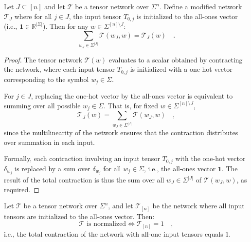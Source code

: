 \documentclass[../../main.tex]{subfiles}
\begin{document}
    \begin{lemma}
        \label{lemma:normalized_tensor_networks}
        Let $J \subseteq [n]$ and let $\mathcal{T}$ be a tensor network over $\Sigma^n$. Define a modified network $\mathcal{T}_J$ where for all $j \in J$, the input tensor $T_{0,j}$ is initialized to the all-ones vector (i.e., $\mathbf{1} \in \mathbb{R}^{|\Sigma|}$). Then for any $w \in \Sigma^{[n] \setminus J}$:
        \[
            \sum_{w_J \in \Sigma^{|J|}} \mathcal{T}(w_J, w) = \mathcal{T}_J(w) \quad .
        \]
    \end{lemma}
    \begin{proof}
    The tensor network $\mathcal{T}(w)$ evaluates to a scalar obtained by contracting the network, where each input tensor $T_{0,j}$ is initialized with a one-hot vector corresponding to the symbol $w_j \in \Sigma$.

    For $j \in J$, replacing the one-hot vector by the all-ones vector is equivalent to summing over all possible $w_j \in \Sigma$. That is, for fixed $w \in \Sigma^{[n] \setminus J}$,
    \[
        \mathcal{T}_J(w) = \sum_{w_J \in \Sigma^{|J|}} \mathcal{T}(w_J, w) \quad ,
    \]
    since the multilinearity of the network ensures that the contraction distributes over summation in each input.

    Formally, each contraction involving an input tensor $T_{0,j}$ with the one-hot vector $\delta_{w_j}$ is replaced by a sum over $\delta_{w_j}$ for all $w_j \in \Sigma$, i.e., the all-ones vector $\mathbf{1}$. The result of the total contraction is thus the sum over all \( w_J \in \Sigma^{|J|} \) of \( \mathcal{T}(w_J, w) \), as required.
    \end{proof}

    \begin{corollary}
        Let $\mathcal{T}$ be a tensor network over $\Sigma^n$, and let $\mathcal{T}_{[n]}$ be the network where all input tensors are initialized to the all-ones vector. Then:
        \[
            \mathcal{T} \text{ is normalized} \iff \mathcal{T}_{[n]} = 1 \quad ,
        \]
        i.e., the total contraction of the network with all-one input tensors equals 1.
    \end{corollary}
\end{document}
